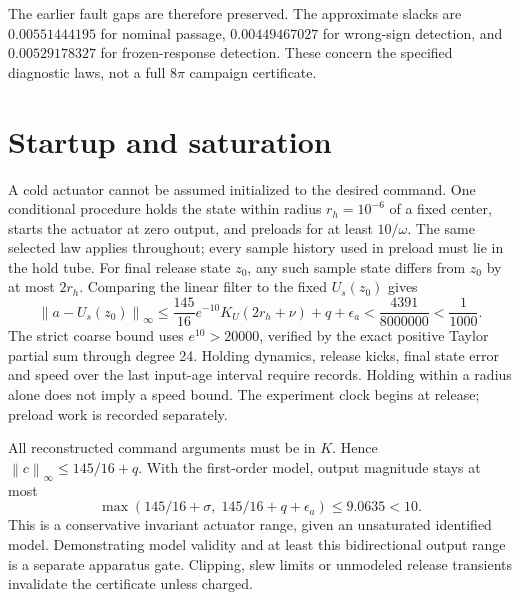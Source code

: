 \documentclass[10pt,a4paper]{article}
\newcommand{\norm}[1]{\left\|#1\right\|_\infty}
\begin{document}
The earlier fault gaps are therefore preserved. The approximate slacks are $0.00551444195$ for nominal passage, $0.00449467027$ for wrong-sign detection, and $0.00529178327$ for frozen-response detection. These concern the specified diagnostic laws, not a full $8\pi$ campaign certificate.

\section{Startup and saturation}
A cold actuator cannot be assumed initialized to the desired command. One conditional procedure holds the state within radius $r_h=10^{-6}$ of a fixed center, starts the actuator at zero output, and preloads for at least $10/\omega$. The same selected law applies throughout; every sample history used in preload must lie in the hold tube. For final release state $z_0$, any such sample state differs from $z_0$ by at most $2r_h$. Comparing the linear filter to the fixed $U_s(z_0)$ gives
\begin{equation}
\norm{a-U_s(z_0)}
\leq\frac{145}{16}e^{-10}
K_U(2r_h+\nu)+q+\epsilon_a
<\frac{4391}{8000000}<\frac1{1000}.
\end{equation}
The strict coarse bound uses $e^{10}>20000$, verified by the exact positive Taylor partial sum through degree 24. Holding dynamics, release kicks, final state error and speed over the last input-age interval require records. Holding within a radius alone does not imply a speed bound. The experiment clock begins at release; preload work is recorded separately.

All reconstructed command arguments must be in $K$. Hence
$\norm c\leq145/16+q$. With the first-order model, output magnitude stays at most
\begin{equation}
\max(145/16+\sigma,\;145/16+q+\epsilon_a)
\leq 9.0635<10 .
\end{equation}
This is a conservative invariant actuator range, given an unsaturated identified model. Demonstrating model validity and at least this bidirectional output range is a separate apparatus gate. Clipping, slew limits or unmodeled release transients invalidate the certificate unless charged.
\newpage
\end{document}
